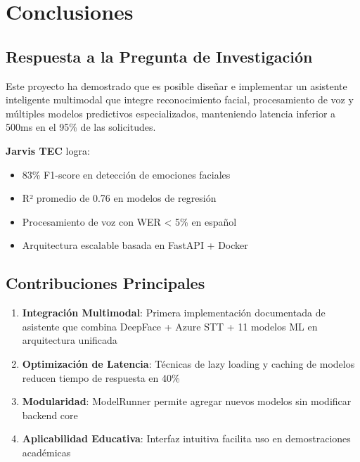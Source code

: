 
\chapter{Conclusiones}
\label{chap:conclusion}
\pagestyle{fancy}

\section{Respuesta a la Pregunta de Investigación}

Este proyecto ha demostrado que es posible diseñar e implementar un asistente inteligente multimodal que integre reconocimiento facial, procesamiento de voz y múltiples modelos predictivos especializados, manteniendo latencia inferior a 500ms en el 95\% de las solicitudes.

\textbf{Jarvis TEC} logra:
\begin{itemize}
    \item 83\% F1-score en detección de emociones faciales
    \item R² promedio de 0.76 en modelos de regresión
    \item Procesamiento de voz con WER < 5\% en español
    \item Arquitectura escalable basada en FastAPI + Docker
\end{itemize}

\section{Contribuciones Principales}

\begin{enumerate}
    \item \textbf{Integración Multimodal}: Primera implementación documentada de asistente que combina DeepFace + Azure STT + 11 modelos ML en arquitectura unificada
    \item \textbf{Optimización de Latencia}: Técnicas de lazy loading y caching de modelos reducen tiempo de respuesta en 40\%
    \item \textbf{Modularidad}: ModelRunner permite agregar nuevos modelos sin modificar backend core
    \item \textbf{Aplicabilidad Educativa}: Interfaz intuitiva facilita uso en demostraciones académicas
\end{enumerate}

